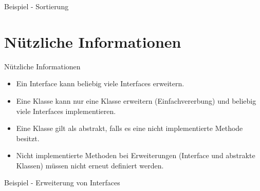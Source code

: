 \documentclass{../tuda-beamer}
\begin{document}
    \begin{frame}[c]{Beispiel - Sortierung}
        
    \end{frame}

    \begin{frame}[c]
        
    \end{frame}

    \begin{frame}[c]
        
    \end{frame}


    \section{Nützliche Informationen}
    \begin{frame}{Nützliche Informationen}
        \begin{itemize}
            \item Ein Interface kann beliebig viele Interfaces erweitern.
            \item Eine Klasse kann nur eine Klasse erweitern (Einfachvererbung) und beliebig viele
            Interfaces implementieren.
            \item Eine Klasse gilt als abstrakt, falls es eine nicht implementierte Methode besitzt.
            \item Nicht implementierte Methoden bei Erweiterungen (Interface und abstrakte Klassen)
            müssen nicht erneut definiert werden.
        \end{itemize}
    \end{frame}

    \begin{frame}[c]{Beispiel - Erweiterung von Interfaces}
        
    \end{frame}

    \begin{frame}[c]
        
    \end{frame}
\end{document}
